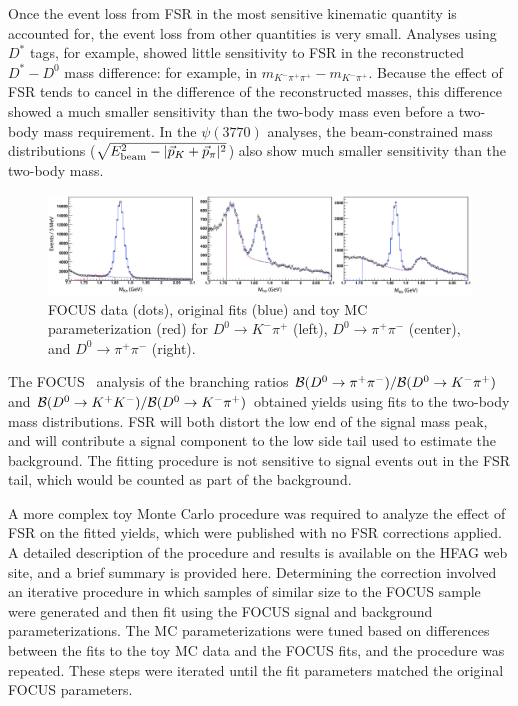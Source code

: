 Once the event loss from FSR in the most sensitive kinematic 
quantity is accounted for, the event loss from other quantities 
is very small.  Analyses using $D^*$ tags, for example, showed 
little sensitivity to FSR in the reconstructed $D^*-D^0$ mass 
difference: for example, in $m_{K^-\pi^+\pi^+}-m_{K^-\pi^+}$. 
Because the effect of FSR tends to cancel in the difference of 
the reconstructed masses, this difference showed a much smaller 
sensitivity than the two-body mass even before a two-body mass 
requirement. In the $\psi(3770)$ analyses, the beam-constrained 
mass distributions 
($\sqrt{E_{\rm beam}^2 - |\vec{p}_K + \vec{p}_\pi|^2}$)  
also show much smaller sensitivity than the two-body mass.
\begin{figure}
\begin{center}
\includegraphics[width=1.00\textwidth]{figures/charm/FocusFits.pdf}
\caption{FOCUS data (dots), original fits (blue) and 
toy MC parameterization (red) for $D^0\to K^-\pi^+$ (left), 
$D^0\to \pi^+\pi^-$ (center), and $D^0\to \pi^+\pi^-$ (right).}
\label{fig:FocusFits}
\end{center}
\end{figure}

The FOCUS~\cite{Link:2002hi} analysis of the branching ratios 
${\cal B}(D^0\to \pi^+\pi^-)/{\cal B}(D^0\to K^-\pi^+)$ and 
${\cal B}(D^0\to K^+ K^-)/{\cal B}(D^0\to K^-\pi^+)$ obtained 
yields using fits to the two-body mass distributions.  FSR will 
both distort the low end of the signal mass peak, and will 
contribute a signal component to the low side tail used to 
estimate the background.  The fitting procedure is not sensitive 
to signal events out in the FSR tail, which would be counted as 
part of the background.

A more complex toy Monte Carlo procedure was required to analyze 
the effect of FSR on the fitted yields, which were published with 
no FSR corrections applied.  A detailed description of the procedure 
and results is available on the HFAG web site, 
and a brief summary is provided
here.  Determining the correction involved an iterative procedure in which samples of similar size to the FOCUS sample were 
generated and then fit using the FOCUS signal and background 
parameterizations.  The MC parameterizations were tuned based 
on differences between the fits to the toy MC data and the FOCUS 
fits, and the procedure was repeated. These steps were iterated until 
the fit parameters matched the original FOCUS parameters.  

